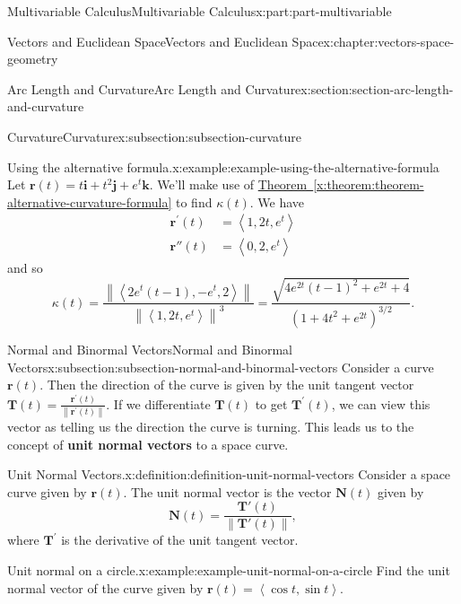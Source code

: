 \documentclass[twoside,10pt,]{book}
\newcommand{\xreffont}{\relax}
\newcommand{\terminology}[1]{\textbf{#1}}
\numberwithin{equation}{part}
\newcommand{\norm}[1]{\left\| #1 \right\|}
\newcommand{\dotprod}[1]{\left\langle #1 \right\rangle}
\begin{document}
\begin{partptx}{Multivariable Calculus}{}{Multivariable Calculus}{}{}{x:part:part-multivariable}
\begin{chapterptx}{Vectors and Euclidean Space}{}{Vectors and Euclidean Space}{}{}{x:chapter:vectors-space-geometry}
\begin{sectionptx}{Arc Length and Curvature}{}{Arc Length and Curvature}{}{}{x:section:section-arc-length-and-curvature}
\begin{subsectionptx}{Curvature}{}{Curvature}{}{}{x:subsection:subsection-curvature}
\begin{example}{Using the alternative formula.}{x:example:example-using-the-alternative-formula}
Let \(\mathbf{r}(t) = t\mathbf{i}+t^{2}\mathbf{j}+e^{t}\mathbf{k}\). We'll make use of \hyperref[x:theorem:theorem-alternative-curvature-formula]{Theorem~{\xreffont\ref{x:theorem:theorem-alternative-curvature-formula}}} to find \(\kappa(t).\) We have%
%
\begin{align*}
\mathbf{r}^\prime(t) & = \dotprod{1,2t,e^{t}} \\
\mathbf{r}''(t) & = \dotprod{0,2,e^{t}} 
\end{align*}
and so%
%
\begin{equation*}
\kappa(t) = \frac{\norm{\dotprod{2e^{t}(t-1),-e^{t},2}}}{\norm{\dotprod{1,2t,e^{t}}}^{3}} = \frac{\sqrt{4e^{2t}(t-1)^{2}+e^{2t}+4}}{(1+4t^{2}+e^{2t})^{3/2}}.
\end{equation*}
\end{example}
\end{subsectionptx}
%
%
\typeout{************************************************}
\typeout{************************************************}
%
\begin{subsectionptx}{Normal and Binormal Vectors}{}{Normal and Binormal Vectors}{}{}{x:subsection:subsection-normal-and-binormal-vectors}
Consider a curve \(\mathbf{r}(t)\). Then the direction of the curve is given by the unit tangent vector \(\mathbf{T}(t) = \frac{\mathbf{r}^\prime(t)}{\norm{\mathbf{r}^\prime(t)}}\). If we differentiate \(\mathbf{T}(t)\) to get \(\mathbf{T}^{\prime}(t)\), we can view this vector as telling us the direction the curve is turning. This leads us to the concept of \terminology{unit normal vectors} to a space curve.%
\begin{definition}{Unit Normal Vectors.}{x:definition:definition-unit-normal-vectors}%
%
Consider a space curve given by \(\mathbf{r}(t)\). The unit normal vector is the vector \(\mathbf{N}(t)\) given by%
%
\begin{equation*}
\mathbf{N}(t) = \frac{\mathbf{T}'(t)}{\norm{\mathbf{T}'(t)}},
\end{equation*}
where \(\mathbf{T}^{\prime}\) is the derivative of the unit tangent vector.%
\end{definition}
\begin{example}{Unit normal on a circle.}{x:example:example-unit-normal-on-a-circle}%
Find the unit normal vector of the curve given by \(\mathbf{r}(t) = \dotprod{\cos t,\sin t}\).%
\par\smallskip%

\end{example}
\end{subsectionptx}
\end{sectionptx}
\end{chapterptx}
\end{partptx}
\end{document}
